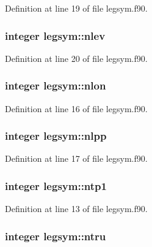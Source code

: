 \-Definition at line 19 of file legsym.\-f90.

\hypertarget{classlegsym_a8b4c67467362c9d324d5ad7bf5b6e78e}{
\subsubsection[{nlev}]{\setlength{\rightskip}{0pt plus 5cm}integer {\bf legsym\-::nlev}}}
\label{classlegsym_a8b4c67467362c9d324d5ad7bf5b6e78e}


\-Definition at line 20 of file legsym.\-f90.

\hypertarget{classlegsym_adc6b16f2626e9dcb618d2d950e2db17a}{
\subsubsection[{nlon}]{\setlength{\rightskip}{0pt plus 5cm}integer {\bf legsym\-::nlon}}}
\label{classlegsym_adc6b16f2626e9dcb618d2d950e2db17a}


\-Definition at line 16 of file legsym.\-f90.

\hypertarget{classlegsym_a296b840ee1daf32583f78f3b8136acb0}{
\subsubsection[{nlpp}]{\setlength{\rightskip}{0pt plus 5cm}integer {\bf legsym\-::nlpp}}}
\label{classlegsym_a296b840ee1daf32583f78f3b8136acb0}


\-Definition at line 17 of file legsym.\-f90.

\hypertarget{classlegsym_a3de2526b7367430bf2925e4d9e293b8d}{
\subsubsection[{ntp1}]{\setlength{\rightskip}{0pt plus 5cm}integer {\bf legsym\-::ntp1}}}
\label{classlegsym_a3de2526b7367430bf2925e4d9e293b8d}


\-Definition at line 13 of file legsym.\-f90.

\hypertarget{classlegsym_a9f44e2174fc92267b46632e481acce37}{
\subsubsection[{ntru}]{\setlength{\rightskip}{0pt plus 5cm}integer {\bf legsym\-::ntru}}}
\label{classlegsym_a9f44e2174fc92267b46632e481acce37}


